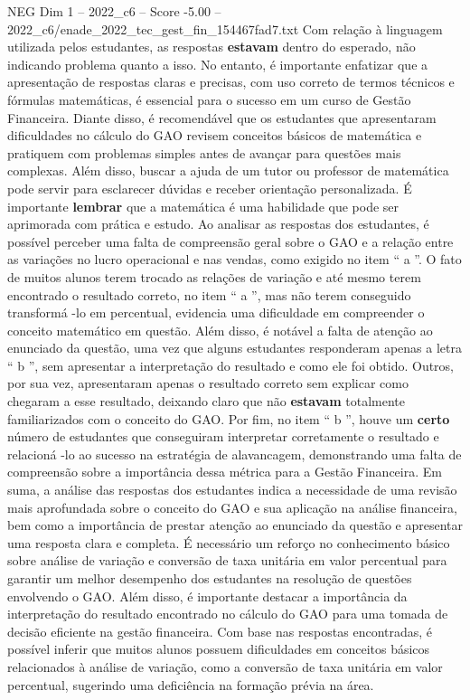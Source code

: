 \begin{textsample}{NEG Dim 1 – 2022\_c6 – Score -5.00 – 2022\_c6/enade\_2022\_tec\_gest\_fin\_154467fad7.txt}
Com relação à linguagem utilizada pelos estudantes, as respostas \textbf{estavam} dentro do esperado, não indicando problema quanto a isso.
No entanto, é importante enfatizar que a apresentação de respostas claras e precisas, com uso correto de termos técnicos e fórmulas matemáticas, é essencial para o sucesso em um curso de Gestão Financeira.
Diante disso, é recomendável que os estudantes que apresentaram dificuldades no cálculo do GAO revisem conceitos básicos de matemática e pratiquem com problemas simples antes de avançar para questões mais complexas.
Além disso, buscar a ajuda de um tutor ou professor de matemática pode servir para esclarecer dúvidas e receber orientação personalizada.
É importante \textbf{lembrar} que a matemática é uma habilidade que pode ser aprimorada com prática e estudo.
Ao analisar as respostas dos estudantes, é possível perceber uma falta de compreensão geral sobre o GAO e a relação entre as variações no lucro operacional e nas vendas, como exigido no item “ a ”.
O fato de muitos alunos terem trocado as relações de variação e até mesmo terem encontrado o resultado correto, no item “ a ”, mas não terem conseguido transformá -lo em percentual, evidencia uma dificuldade em compreender o conceito matemático em questão.
Além disso, é notável a falta de atenção ao enunciado da questão, uma vez que alguns estudantes responderam apenas a letra “ b ”, sem apresentar a interpretação do resultado e como ele foi obtido.
Outros, por sua vez, apresentaram apenas o resultado correto sem explicar como chegaram a esse resultado, deixando claro que não \textbf{estavam} totalmente familiarizados com o conceito do GAO.
Por fim, no item “ b ”, houve um \textbf{certo} número de estudantes que conseguiram interpretar corretamente o resultado e relacioná -lo ao sucesso na estratégia de alavancagem, demonstrando uma falta de compreensão sobre a importância dessa métrica para a Gestão Financeira.
Em suma, a análise das respostas dos estudantes indica a necessidade de uma revisão mais aprofundada sobre o conceito do GAO e sua aplicação na análise financeira, bem como a importância de prestar atenção ao enunciado da questão e apresentar uma resposta clara e completa.
É necessário um reforço no conhecimento básico sobre análise de variação e conversão de taxa unitária em valor percentual para garantir um melhor desempenho dos estudantes na resolução de questões envolvendo o GAO.
Além disso, é importante destacar a importância da interpretação do resultado encontrado no cálculo do GAO para uma tomada de decisão eficiente na gestão financeira.
Com base nas respostas encontradas, é possível inferir que muitos alunos possuem dificuldades em conceitos básicos relacionados à análise de variação, como a conversão de taxa unitária em valor percentual, sugerindo uma deficiência na formação prévia na área.

\end{textsample}
